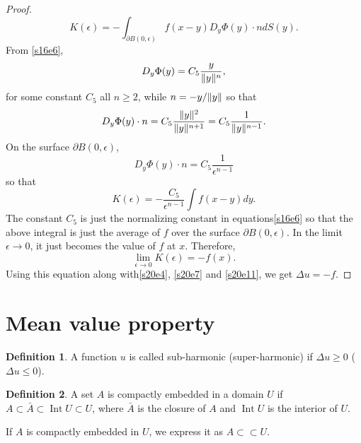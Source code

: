 \documentclass{article}
\newcommand{\cce}{\subset\subset}
\DeclarePairedDelimiter\norm{\lVert}{\rVert}
\DeclareMathOperator*{\Int}{Int}
\theoremstyle{plain}
\numberwithin{thm}{section}
\theoremstyle{plain}
\numberwithin{prop}{section}
\theoremstyle{definition}
\newtheorem{defn}{Definition}
\numberwithin{defn}{section}
\theoremstyle{remark}
\numberwithin{equation}{section}
\begin{document}
\begin{proof}
\[
K(\epsilon) = -\int_{\partial B(0, \epsilon)} f(x - y) D_y\Phi(y) \cdot n  dS(y).
\]
From \eqref{s16e6},
\[
D_y\Phi(y) = C_5 \frac{y}{\norm{y}^n},
\]
for some constant $C_5$ all $n \ge 2$, while $n = -y/\norm{y}$ so that
\[
D_y\Phi(y) \cdot n = C_5\frac{\norm{y}^2}{\norm{y}^{n+1}} = C_5\frac{1}{\norm{y}^{n-1}}.
\]
On the surface $\partial B(0, \epsilon)$,
\[
D_y\Phi(y) \cdot n = C_5\frac{1}{\epsilon^{n-1}}
\]
so that
\[
K(\epsilon) = -\frac{C_5}{\epsilon^{n-1}}\int f(x - y)dy.
\]
The constant $C_5$ is just the normalizing constant in equations\eqref{s16e6} so that the above
integral is just the average of $f$ over the surface $\partial B(0, \epsilon)$. In the limit
$\epsilon \rightarrow 0$, it just becomes the value of $f$ at $x$. Therefore,
\[
\lim_{\epsilon \rightarrow 0}K(\epsilon) = -f(x).
\]
Using this equation along with\eqref{s20e4}, \eqref{s20e7} and \eqref{s20e11}, we get $\Delta u = -f$.
\end{proof}

\section{Mean value property}\label{s21}
\begin{defn}\label{s21d1}
A function $u$ is called sub-harmonic (super-harmonic) if $\Delta u \ge 0$ ($\Delta u \le 0$).
\end{defn}

\begin{defn}\label{s21d2}
A set $A$ is compactly embedded in a domain $U$ if $A \subset \bar{A} \subset \Int{U} \subset U$,
where $\bar{A}$ is the closure of $A$ and $\Int{U}$ is the interior of $U$.
\end{defn}

\noindent If $A$ is compactly embedded in $U$, we express it as $A \cce U$.
\end{document}
